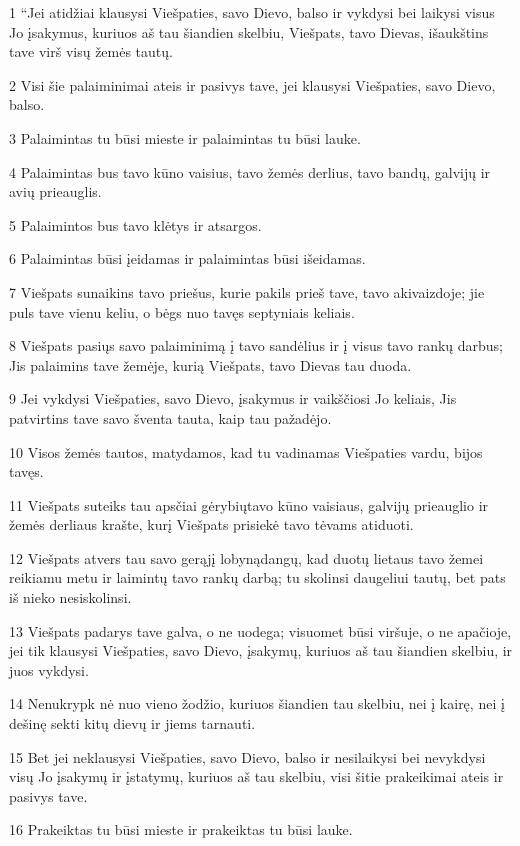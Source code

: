 \par 1 “Jei atidžiai klausysi Viešpaties, savo Dievo, balso ir vykdysi bei laikysi visus Jo įsakymus, kuriuos aš tau šiandien skelbiu, Viešpats, tavo Dievas, išaukštins tave virš visų žemės tautų. 
\par 2 Visi šie palaiminimai ateis ir pasivys tave, jei klausysi Viešpaties, savo Dievo, balso. 
\par 3 Palaimintas tu būsi mieste ir palaimintas tu būsi lauke. 
\par 4 Palaimintas bus tavo kūno vaisius, tavo žemės derlius, tavo bandų, galvijų ir avių prieauglis. 
\par 5 Palaimintos bus tavo klėtys ir atsargos. 
\par 6 Palaimintas būsi įeidamas ir palaimintas būsi išeidamas. 
\par 7 Viešpats sunaikins tavo priešus, kurie pakils prieš tave, tavo akivaizdoje; jie puls tave vienu keliu, o bėgs nuo tavęs septyniais keliais. 
\par 8 Viešpats pasiųs savo palaiminimą į tavo sandėlius ir į visus tavo rankų darbus; Jis palaimins tave žemėje, kurią Viešpats, tavo Dievas tau duoda. 
\par 9 Jei vykdysi Viešpaties, savo Dievo, įsakymus ir vaikščiosi Jo keliais, Jis patvirtins tave savo šventa tauta, kaip tau pažadėjo. 
\par 10 Visos žemės tautos, matydamos, kad tu vadinamas Viešpaties vardu, bijos tavęs. 
\par 11 Viešpats suteiks tau apsčiai gėrybių­tavo kūno vaisiaus, galvijų prieauglio ir žemės derliaus­ krašte, kurį Viešpats prisiekė tavo tėvams atiduoti. 
\par 12 Viešpats atvers tau savo gerąjį lobyną­dangų, kad duotų lietaus tavo žemei reikiamu metu ir laimintų tavo rankų darbą; tu skolinsi daugeliui tautų, bet pats iš nieko nesiskolinsi. 
\par 13 Viešpats padarys tave galva, o ne uodega; visuomet būsi viršuje, o ne apačioje, jei tik klausysi Viešpaties, savo Dievo, įsakymų, kuriuos aš tau šiandien skelbiu, ir juos vykdysi. 
\par 14 Nenukrypk nė nuo vieno žodžio, kuriuos šiandien tau skelbiu, nei į kairę, nei į dešinę sekti kitų dievų ir jiems tarnauti. 
\par 15 Bet jei neklausysi Viešpaties, savo Dievo, balso ir nesilaikysi bei nevykdysi visų Jo įsakymų ir įstatymų, kuriuos aš tau skelbiu, visi šitie prakeikimai ateis ir pasivys tave. 
\par 16 Prakeiktas tu būsi mieste ir prakeiktas tu būsi lauke. 
